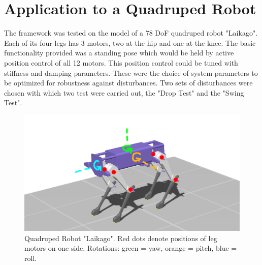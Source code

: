     
    








    


    




\section{Application to a Quadruped Robot} \label{app}
    
    The framework was tested on the model of a 78 DoF quadruped robot "Laikago". Each of its four legs has 3 motors, two at the hip and one at the knee. The basic functionality provided was a standing pose which would be held by active position control of all 12 motors. This position control could be tuned with stiffness and damping parameters. These were the choice of system parameters to be optimized for robustness against disturbances. Two sets of disturbances were chosen with which two test were carried out, the "Drop Test" and the "Swing Test". 

    \begin{figure}[h!]
    \centering
    \includegraphics[width=.5\linewidth]{figures/laikago_zoom.png}
    \caption[Quadruped Robot "Laikago"]{Quadruped Robot "Laikago". Red dots denote positions of leg motors on one side. Rotations: green = yaw, orange = pitch, blue = roll.}
    \label{fig:lkg}
    \end{figure}

